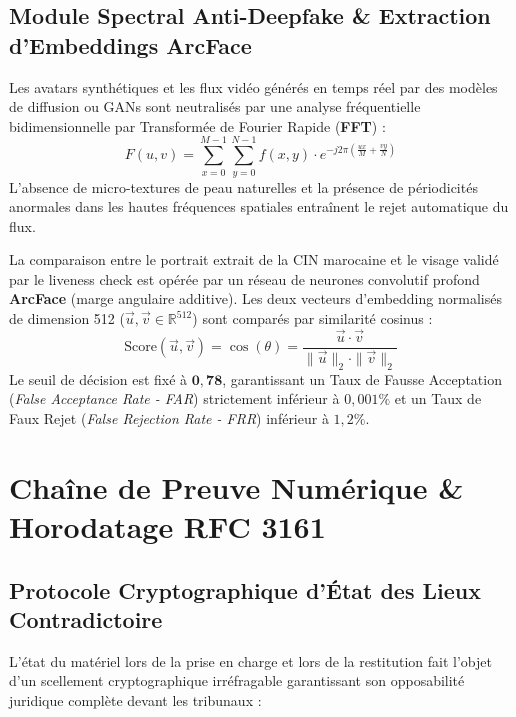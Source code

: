 \documentclass[11pt,a4paper]{report}
\begin{document}
\section{Module Spectral Anti-Deepfake \& Extraction d'Embeddings ArcFace}
Les avatars synthétiques et les flux vidéo générés en temps réel par des modèles de diffusion ou GANs sont neutralisés par une analyse fréquentielle bidimensionnelle par Transformée de Fourier Rapide (\textbf{FFT}) :
\begin{equation}
F(u, v) = \sum_{x=0}^{M-1} \sum_{y=0}^{N-1} f(x, y) \cdot e^{-j 2\pi \left(\frac{ux}{M} + \frac{vy}{N}\right)}
\end{equation}
L'absence de micro-textures de peau naturelles et la présence de périodicités anormales dans les hautes fréquences spatiales entraînent le rejet automatique du flux.

La comparaison entre le portrait extrait de la CIN marocaine et le visage validé par le liveness check est opérée par un réseau de neurones convolutif profond \textbf{ArcFace} (marge angulaire additive). Les deux vecteurs d'embedding normalisés de dimension 512 ($\vec{u}, \vec{v} \in \mathbb{R}^{512}$) sont comparés par similarité cosinus :
\begin{equation}
\text{Score}(\vec{u}, \vec{v}) = \cos(\theta) = \frac{\vec{u} \cdot \vec{v}}{\|\vec{u}\|_2 \cdot \|\vec{v}\|_2}
\end{equation}
Le seuil de décision est fixé à $\mathbf{0,78}$, garantissant un Taux de Fausse Acceptation (\textit{False Acceptance Rate - FAR}) strictement inférieur à $0,001\%$ et un Taux de Faux Rejet (\textit{False Rejection Rate - FRR}) inférieur à $1,2\%$.

\chapter{Chaîne de Preuve Numérique \& Horodatage RFC 3161}

\section{Protocole Cryptographique d'État des Lieux Contradictoire}
L'état du matériel lors de la prise en charge et lors de la restitution fait l'objet d'un scellement cryptographique irréfragable garantissant son opposabilité juridique complète devant les tribunaux :
\end{document}

